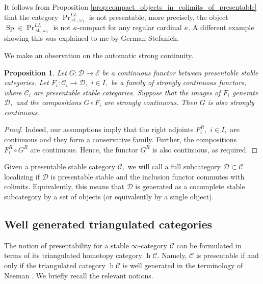 \documentclass[11pt,leqno]{amsart}
\newtheorem{prop}[theo]{Proposition}
\numberwithin{equation}{section}
\def\h{\operatorname{h}}
\newcommand{\st}{\operatorname{st}}
\newcommand{\cD}{{\mathcal D}}
\newcommand{\cC}{{\mathcal C}}
\newcommand{\cE}{{\mathcal E}}
\newcommand{\cY}{{\mathcal Y}}
\newcommand{\Sp}{\operatorname{Sp}}
\newcommand{\Ind}{\operatorname{Ind}}
\begin{document}
It follows from Proposition \ref{prop:compact_objects_in_colimits_of_presentable} that the category $\Pr^{LL}_{\st,\omega_1}$ is not presentable, more precisely, the object $\Sp\in\Pr^{LL}_{\st,\omega_1}$ is not $\kappa$-compact for any regular cardinal $\kappa.$ A different example showing this was explained to me by German Stefanich.

We make an observation on the automatic strong continuity.

\begin{prop}\label{prop:automatic_strcont} Let $G:\cD\to\cE$ be a continuous functor between presentable stable categories. Let $F_i:\cC_i\to\cD,$ $i\in I,$ be a family of strongly continuous functors, where $\cC_i$ are presentable stable categories. Suppose that the images of $F_i$ generate $\cD,$ and the compositions $G\circ F_i$ are strongly continuous. Then $G$ is also strongly continuous.\end{prop}

\begin{proof}%
Indeed, our assumptions imply that the right adjoints $F_i^R,$ $i\in I,$ are continuous and they form a conservative family. Further, the compositions $F_i^R\circ G^R$ are continuous. Hence, the functor $G^R$ is also continuous, as required.\end{proof}

Given a presentable stable category $\cC,$ we will call a full subcategory $\cD\subset\cC$ localizing if $\cD$ is presentable stable and the inclusion functor commutes with colimits. Equivalently, this means that $\cD$ is generated as a cocomplete stable subcategory by a set of objects (or equivalently by a single object).

\subsection{Well generated triangulated categories}

The notion of presentability for a stable $\infty$-category $\cC$ can be formulated in terms of its triangulated homotopy category $\h\cC.$ Namely, $\cC$ is presentable if and only if the triangulated category $\h\cC$ is well generated in the terminology of Neeman \cite{Nee01}. We briefly recall the relevant notions.
\end{document}
